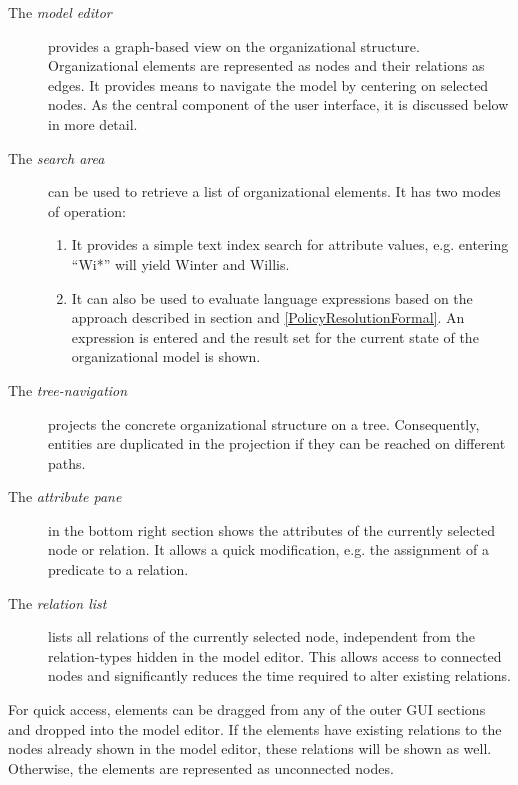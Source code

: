 \begin{description}
  \item[The \emph{model editor}] provides a graph-based view on the organizational structure. Organizational elements are represented as nodes and their relations as edges. It provides means to navigate the model by centering on selected nodes. As the central component of the user interface, it is discussed below in more detail.
	\item[The \emph{search area}] can be used to retrieve a list of organizational elements. It has two modes of operation:
	  \begin{enumerate}
		  \item It provides a simple text index search for attribute values, e.g. entering ``Wi*'' will yield Winter and Willis.
			\item It can also be used to evaluate language expressions based on the approach described in section  and \ref{PolicyResolutionFormal}. An expression is entered and the result set for the current state of the organizational model is shown.
		\end{enumerate}
	\item[The \emph{tree-navigation}] projects the concrete organizational structure on a tree. Consequently, entities are duplicated in the projection if they can be reached on different paths.
	\item[The \emph{attribute pane}] in the bottom right section shows the attributes of the currently selected node or relation. It allows a quick modification, e.g. the assignment of a predicate to a relation.
	\item[The \emph{relation list}] lists all relations of the currently selected node, independent from the relation-types hidden in the model editor. This allows access to connected nodes and significantly reduces the time required to alter existing relations.
\end{description}

For quick access, elements can be dragged from any of the outer GUI sections and dropped into the model editor. If the elements have existing relations to the nodes already shown in the model editor, these relations will be shown as well. Otherwise, the elements are represented as unconnected nodes.

